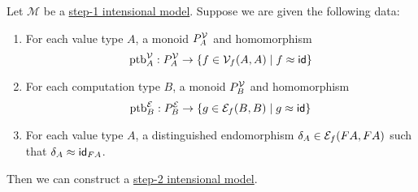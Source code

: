 \begin{lemma}\label{lem:step-1-model-to-step-2-model}
Let $\mathcal M$ be a \hyperref[def:step-1-model]{step-1 intensional model}.
Suppose we are given the following data:

\begin{enumerate}
    \item For each value type $A$, a monoid $P^{\mathcal{V}}_A$ and homomorphism 
    \[ \text{ptb}^\mathcal{V}_A : P^{\mathcal{V}}_A \to \{ f \in \mathcal{V}_f(A,A) \mid f \approx \mathsf{id} \} \]

    \item For each computation type $B$, a monoid $P^{\mathcal{V}}_B$ and homomorphism
    \[ \text{ptb}^\mathcal{E}_B : P^{\mathcal{E}}_B \to \{ g \in \mathcal{E}_f(B,B) \mid g \approx \mathsf{id} \} \]

    \item For each value type $A$, a distinguished endomorphism
    $\delta_A \in \mathcal{E}_f(FA, FA)$ such that $\delta_A \approx \mathsf{id}_{FA}$.
\end{enumerate}

Then we can construct a \hyperref[def:step-2-model]{step-2 intensional model}.
\end{lemma}
